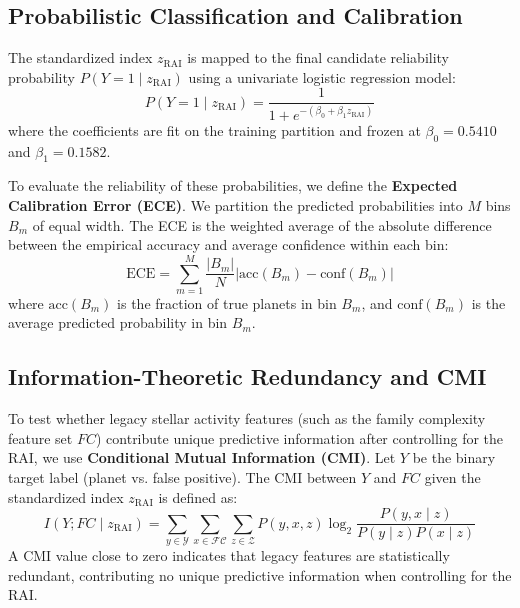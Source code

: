 \subsection{Probabilistic Classification and Calibration} \label{sec:method_calibration}
The standardized index $z_{\text{RAI}}$ is mapped to the final candidate reliability probability $P(Y=1 \mid z_{\text{RAI}})$ using a univariate logistic regression model:
\begin{equation}
P(Y=1 \mid z_{\text{RAI}}) = \frac{1}{1 + e^{-(\beta_0 + \beta_1 z_{\text{RAI}})}}
\label{eq:logistic_link}
\end{equation}
where the coefficients are fit on the training partition and frozen at $\beta_0 = 0.5410$ and $\beta_1 = 0.1582$.

To evaluate the reliability of these probabilities, we define the \textbf{Expected Calibration Error (ECE)}. We partition the predicted probabilities into $M$ bins $B_m$ of equal width. The ECE is the weighted average of the absolute difference between the empirical accuracy and average confidence within each bin:
\begin{equation}
\text{ECE} = \sum_{m=1}^{M} \frac{|B_m|}{N} \left| \text{acc}(B_m) - \text{conf}(B_m) \right|
\label{eq:ece}
\end{equation}
where $\text{acc}(B_m)$ is the fraction of true planets in bin $B_m$, and $\text{conf}(B_m)$ is the average predicted probability in bin $B_m$.

\subsection{Information-Theoretic Redundancy and CMI} \label{sec:method_cmi}
To test whether legacy stellar activity features (such as the family complexity feature set $FC$) contribute unique predictive information after controlling for the RAI, we use \textbf{Conditional Mutual Information (CMI)}. Let $Y$ be the binary target label (planet vs. false positive). The CMI between $Y$ and $FC$ given the standardized index $z_{\text{RAI}}$ is defined as:
\begin{equation}
I(Y; FC \mid z_{\text{RAI}}) = \sum_{y \in \mathcal{Y}} \sum_{x \in \mathcal{FC}} \sum_{z \in \mathcal{Z}} P(y, x, z) \log_2 \frac{P(y, x \mid z)}{P(y \mid z) P(x \mid z)}
\label{eq:cmi}
\end{equation}
A CMI value close to zero indicates that legacy features are statistically redundant, contributing no unique predictive information when controlling for the RAI.

